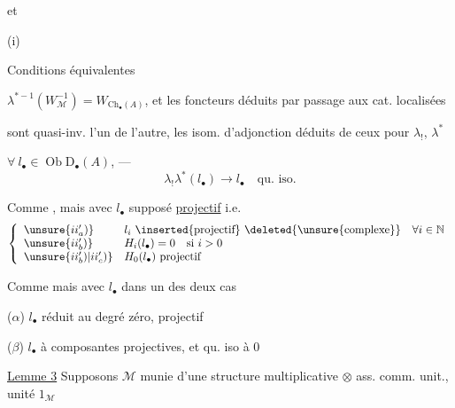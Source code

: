 
 et 

(i) 


Conditions équivalentes

 
$\lambda^{*-1}(W_{\mathcal M}^{-1})=W_{\mathrm{Ch}_\bullet(A)}$,
et les foncteurs déduits par passage aux cat. localisées


sont quasi-inv. l'un de l'autre, les isom. d'adjonction déduits de ceux pour $\lambda_!$, $\lambda^*$

 $\forall\ l_\bullet\in\operatorname{Ob}\mathrm D_\bullet(A)$, ---
\[
\lambda_!\lambda^*(l_\bullet)\longrightarrow l_\bullet\quad\text{qu. iso.}
\]

 Comme , mais avec $l_\bullet$ supposé \uline{projectif}
i.e.
\[
\left\{\begin{array}{ll}
\unsure{ii'_a)}&l_i\text{ \inserted{projectif}}\ \deleted{\unsure{\text{complexe}}}\quad\forall i\in\mathbb N\\
\unsure{ii'_b)}&H_i(l_\bullet)=0\quad\text{si }i>0\\
\unsure{ii'_b)|ii'_c)}&H_0(l_\bullet)\text{ projectif}
\end{array}\right.
\]

 Comme  mais avec $l_\bullet$ dans un des deux cas

($\alpha$) $l_\bullet$ réduit au degré zéro, projectif

($\beta$) $l_\bullet$ à composantes projectives,
 et qu. iso à $0$

\uline{Lemme 3} Supposons $\mathcal M$ 
munie d'une structure multiplicative $\otimes$ 
ass. comm. unit.,  unité $1_{\mathcal M}$

